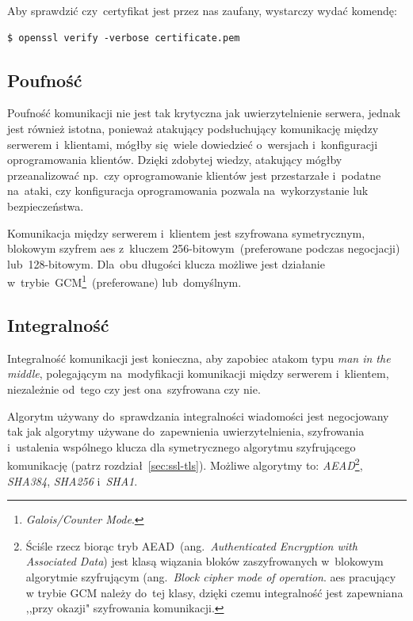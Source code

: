 \documentclass[thesis]{subfiles}
\begin{document}
Aby sprawdzić czy~certyfikat jest przez nas zaufany, wystarczy wydać komendę:
\begin{lstlisting}[numbers=none]
$ openssl verify -verbose certificate.pem
\end{lstlisting}


\subsection{Poufność}

Poufność komunikacji nie jest tak krytyczna jak uwierzytelnienie serwera, jednak jest również istotna, ponieważ atakujący podsłuchujący komunikację między serwerem i~klientami, mógłby się~wiele dowiedzieć o~wersjach i~konfiguracji oprogramowania klientów. Dzięki zdobytej wiedzy, atakujący mógłby przeanalizować np.~czy oprogramowanie klientów jest przestarzałe i~podatne na~ataki, czy konfiguracja oprogramowania pozwala na~wykorzystanie luk bezpieczeństwa.

Komunikacja między serwerem i~klientem jest szyfrowana symetrycznym, blokowym szyfrem \gls{aes} z~kluczem 256-bitowym~(preferowane podczas negocjacji) lub~128-bitowym. Dla~obu długości klucza możliwe jest działanie w~trybie~GCM\footnote{\emph{Galois/Counter Mode}.}~(preferowane) lub~domyślnym.


\subsection{Integralność}

Integralność komunikacji jest konieczna, aby zapobiec atakom typu \emph{man in the middle}, polegającym na~modyfikacji komunikacji między serwerem i~klientem, niezależnie od~tego czy jest ona~szyfrowana czy nie.

Algorytm używany do~sprawdzania integralności wiadomości jest negocjowany tak jak algorytmy używane do~zapewnienia uwierzytelnienia, szyfrowania i~ustalenia wspólnego klucza dla symetrycznego algorytmu szyfrującego komunikację (patrz rozdział~\ref{sec:ssl-tls}). Możliwe algorytmy to: \emph{AEAD}\footnote{Ściśle rzecz biorąc tryb AEAD~(ang.~\emph{Authenticated Encryption with Associated Data}) jest klasą wiązania bloków zaszyfrowanych w~blokowym algorytmie szyfrującym (ang.~\emph{Block cipher mode of operation}. \gls{aes} pracujący w trybie GCM należy do~tej klasy, dzięki czemu integralność jest zapewniana ,,przy okazji" szyfrowania komunikacji.}, \emph{SHA384}, \emph{SHA256} i~\emph{SHA1}.
\end{document}
